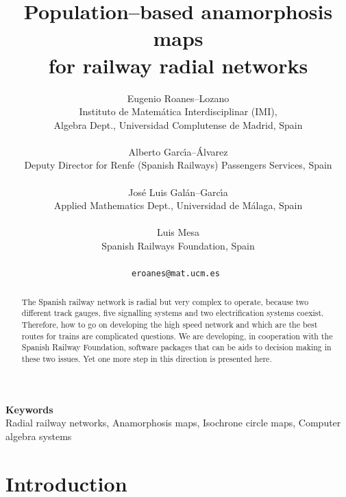 \documentclass[a4paper]{article} %
\date{} %
\def\keywords#1{\begin{center}{\bf Keywords}\\{#1}\end{center}} %
\def\titulo#1{\title{#1}} %
\def\autores#1{\author{#1}} %
\begin{document}
\titulo{Population--based anamorphosis maps\\ for railway radial networks}

\autores{Eugenio Roanes--Lozano \\ %
         Instituto de Matem\'atica Interdisciplinar (IMI),\\
         Algebra Dept., Universidad Complutense de Madrid, Spain\\ \\ %
         Alberto Garc\'{\i}a--\'Alvarez \\ %
         Deputy Director for Renfe (Spanish Railways) Passengers Services, Spain \\ \\ %
         Jos\'e Luis Gal\'an--Garc\'{\i}a \\ %
         Applied Mathematics Dept., Universidad de M\'alaga, Spain \\ \\ %
         Luis Mesa \\ %
         Spanish Railways Foundation, Spain\\ \\ %
         \tt{eroanes@mat.ucm.es} %
       }%


\maketitle

\thispagestyle{empty}




\begin{abstract}
The Spanish railway network is radial but very complex to
operate, because two different track gauges, five signalling
systems and two electrification systems coexist. Therefore, how
to go on developing the high speed network and which are the best
routes for trains are complicated questions. We are developing,
in cooperation with the Spanish Railway Foundation, software
packages that can be aids to decision making in these two issues.
Yet one more step in this direction is presented here.
\end{abstract}

\keywords{Radial railway networks, Anamorphosis maps, Isochrone
circle maps, Computer algebra systems}

\section{Introduction}
\end{document}
